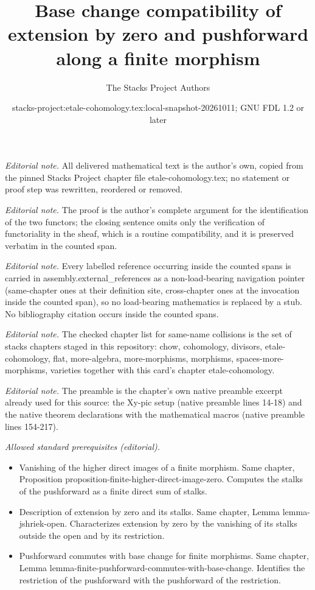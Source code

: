 \documentclass[10pt,a4paper]{amsart}
\title{Base change compatibility of extension by zero and pushforward along a finite morphism}
\author{The Stacks Project Authors}
\date{stacks-project:etale-cohomology.tex:local-snapshot-20261011; GNU FDL 1.2 or later}
\theoremstyle{plain}
\theoremstyle{definition}
\theoremstyle{remark}
\numberwithin{equation}{subsection}
\begin{document}
\maketitle
\noindent\textit{Editorial note.} All delivered mathematical text is the author's own, copied from the pinned Stacks Project chapter file etale-cohomology.tex; no statement or proof step was rewritten, reordered or removed.\par\medskip
\noindent\textit{Editorial note.} The proof is the author's complete argument for the identification of the two functors; the closing sentence omits only the verification of functoriality in the sheaf, which is a routine compatibility, and it is preserved verbatim in the counted span.\par\medskip
\noindent\textit{Editorial note.} Every labelled reference occurring inside the counted spans is carried in assembly.external\_references as a non-load-bearing navigation pointer (same-chapter ones at their definition site, cross-chapter ones at the invocation inside the counted span), so no load-bearing mathematics is replaced by a stub. No bibliography citation occurs inside the counted spans.\par\medskip
\noindent\textit{Editorial note.} The checked chapter list for same-name collisions is the set of stacks chapters staged in this repository: chow, cohomology, divisors, etale-cohomology, flat, more-algebra, more-morphisms, morphisms, spaces-more-morphisms, varieties together with this card's chapter etale-cohomology.\par\medskip
\noindent\textit{Editorial note.} The preamble is the chapter's own native preamble excerpt already used for this source: the Xy-pic setup (native preamble lines 14-18) and the native theorem declarations with the mathematical macros (native preamble lines 154-217).\par\medskip
\noindent\textit{Allowed standard prerequisites (editorial).}\begin{itemize}
\item Vanishing of the higher direct images of a finite morphism. Same chapter, Proposition proposition-finite-higher-direct-image-zero. Computes the stalks of the pushforward as a finite direct sum of stalks.
\item Description of extension by zero and its stalks. Same chapter, Lemma lemma-jshriek-open. Characterizes extension by zero by the vanishing of its stalks outside the open and by its restriction.
\item Pushforward commutes with base change for finite morphisms. Same chapter, Lemma lemma-finite-pushforward-commutes-with-base-change. Identifies the restriction of the pushforward with the pushforward of the restriction.
\end{itemize}\medskip
\end{document}
